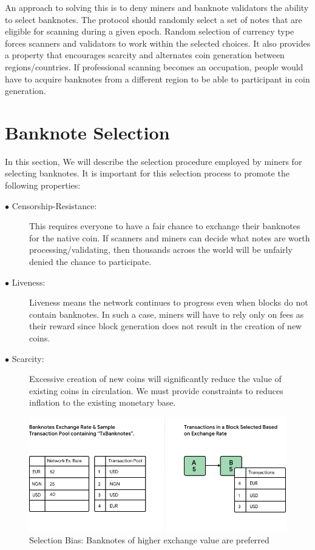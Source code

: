 An approach to solving this is to deny miners and banknote validators the ability to select banknotes. The protocol should randomly select a set of notes that are eligible for scanning during a given epoch. Random selection of currency type forces scanners and validators to work within the selected choices.  It also provides a property that encourages scarcity and alternates coin generation between regions/countries. If professional scanning becomes an occupation, people would have to acquire banknotes from a different region to be able to participant in coin generation.  


\section{Banknote Selection}

In this section, We will describe the selection procedure employed by miners for selecting banknotes. It is important for this selection process to promote the following properties:
 \vspace{1mm}
\begin{description}
  \item[$\bullet$ Censorship-Resistance:] This requires everyone to have a fair chance to exchange their banknotes for the native coin. If scanners and miners can decide what notes are worth processing/validating, then thousands across the world will be unfairly denied the chance to participate. 
  \item[$\bullet$ Liveness:]  Liveness means the network continues to progress even when blocks do not contain banknotes. In such a case, miners will have to rely only on fees as their reward since block generation does not result in the creation of new coins.
  \item[$\bullet$ Scarcity:] Excessive creation of new coins will significantly reduce the value of existing coins in circulation. We must provide constraints to reduces inflation to the existing monetary base. 
  
\end{description}

\begin{figure}[H]
  \includegraphics[width=\linewidth]{images/fig2}
  \caption{Selection Bias: Banknotes of higher exchange value are preferred}
  \label{fig:select_bias}
\end{figure}
\vspace{3mm}


